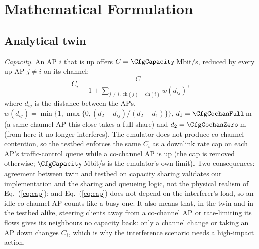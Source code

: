 \documentclass[conference]{IEEEtran}
\begin{document}
\section{Mathematical Formulation}
\subsection{Analytical twin}
\emph{Capacity.} An AP $i$ that is up offers $C=\CfgCapacity$\,Mbit/s, reduced by every up AP $j\neq i$ on its channel:
\begin{equation}
\boxed{C_i=\frac{C}{1+\sum_{j\neq i,\ \mathrm{ch}(j)=\mathrm{ch}(i)} w(d_{ij})}},
\label{eq:cap}
\end{equation}
where $d_{ij}$ is the distance between the APs, $w(d_{ij})=\min\{1,\max\{0,(d_2-d_{ij})/(d_2-d_1)\}\}$, $d_1=\CfgCochanFull$\,m (a same-channel AP this close takes a full share) and $d_2=\CfgCochanZero$\,m (from here it no longer interferes). The emulator does not produce co-channel contention, so the testbed enforces the same $C_i$ as a downlink rate cap on each AP's traffic-control queue while a co-channel AP is up (the cap is removed otherwise; $\CfgCapacity$\,Mbit/s is the emulator's own limit). Two consequences: agreement between twin and testbed on capacity sharing validates our implementation and the sharing and queueing logic, not the physical realism of Eq.~(\ref{eq:cap}); and Eq.~(\ref{eq:cap}) does not depend on the interferer's load, so an idle co-channel AP counts like a busy one. It also means that, in the twin and in the testbed alike, steering clients away from a co-channel AP or rate-limiting its flows gives its neighbours no capacity back: only a channel change or taking an AP down changes $C_i$, which is why the interference scenario needs a high-impact action.
\end{document}
